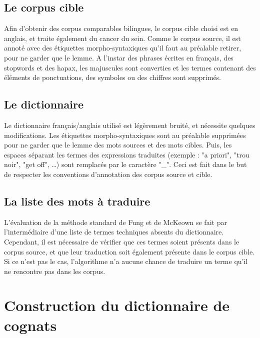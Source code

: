 	\subsection{Le corpus cible}
	
	Afin d'obtenir des corpus comparables bilingues, le corpus cible choisi est en anglais, et traite également du cancer du sein. Comme le corpus source, il est annoté avec des étiquettes morpho-syntaxiques qu'il faut au préalable retirer, pour ne garder que le lemme. A l'instar des phrases écrites en français, des stopwords et des hapax, les majuscules sont converties et les termes contenant des éléments de ponctuations, des symboles ou des chiffres sont supprimés.
	
	\subsection{Le dictionnaire}
	
	Le dictionnaire français/anglais utilisé est légèrement bruité, et nécessite quelques modifications. Les étiquettes morpho-syntaxiques sont au préalable supprimées pour ne garder que le lemme des mots sources et des mots cibles. Puis, les espaces séparant les termes des expressions traduites (exemple : "a priori", "trou noir", "get off", \dots) sont remplacés par le caractère "\_". Ceci est fait dans le but de respecter les conventions d'annotation des corpus source et cible.
	
	\subsection{La liste des mots à traduire}
	
	L'évaluation de la méthode standard de Fung et de McKeown se fait par l'intermédiaire d'une liste de termes techniques absents du dictionnaire. Cependant, il est nécessaire de vérifier que ces termes soient présents dans le corpus source, et que leur traduction soit également présente dans le corpus cible. Si ce n'est pas le cas, l'algorithme n'a aucune chance de traduire un terme qu'il ne rencontre pas dans les corpus.


\section{Construction du dictionnaire de cognats}

